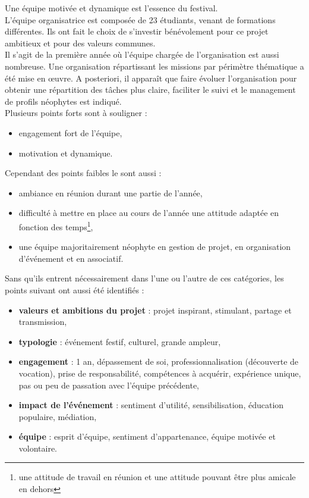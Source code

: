 \documentclass[12pt,a4paper]{report}
\begin{document}
Une équipe motivée et dynamique est l'essence du festival.\\

L’équipe organisatrice est composée de 23 étudiants, venant de formations différentes. Ils ont fait le choix de s’investir bénévolement pour ce projet ambitieux et pour des valeurs communes.\\

Il s'agit de la première année où l'équipe chargée de l'organisation est aussi nombreuse. Une organisation répartissant les missions par périmètre thématique a été mise en œuvre. A posteriori, il apparaît que faire évoluer l'organisation pour obtenir une répartition des tâches plus claire, faciliter le suivi et le management de profils néophytes est indiqué.\\

Plusieurs points forts sont à souligner : 
\begin{itemize}
\item engagement fort de l'équipe,
\item motivation et dynamique.\\
\end{itemize}

Cependant des points faibles le sont aussi : 
\begin{itemize}
\item ambiance en réunion durant une partie de l'année,
\item difficulté à mettre en place au cours de l’année une attitude adaptée en fonction des temps\footnote{une attitude de travail en réunion et une attitude pouvant être plus amicale en dehors},
\item une équipe majoritairement néophyte en gestion de projet, en organisation d’événement et en associatif.\\
\end{itemize}

Sans qu'ils entrent nécessairement dans l'une ou l'autre de ces catégories, les points suivant ont aussi été identifiés :
\begin{itemize}
\item \textbf{valeurs et ambitions du projet} : projet inspirant, stimulant, partage et transmission,
\item \textbf{typologie} : événement festif, culturel, grande ampleur,
\item \textbf{engagement} : 1 an, dépassement de soi, professionnalisation (découverte de vocation), prise de responsabilité, compétences à acquérir, expérience unique, pas ou peu de passation avec l'équipe précédente,
\item \textbf{impact de l'événement} : sentiment d'utilité, sensibilisation, éducation populaire, médiation,
\item \textbf{équipe} : esprit d'équipe, sentiment d'appartenance, équipe motivée et volontaire.\\
\end{itemize}
\end{document}
